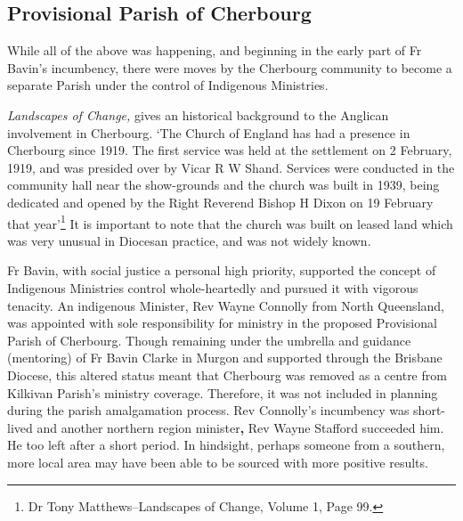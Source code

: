 \subsection{Provisional Parish of Cherbourg}



While all of the above was happening, and beginning in the early part of Fr Bavin's incumbency, there were moves by the Cherbourg community to become a separate Parish under the control of Indigenous Ministries.



\emph{Landscapes of Change,} gives an historical background to the Anglican involvement in Cherbourg. `The Church of England has had a presence in Cherbourg since 1919. The first service was held at the settlement on 2 February, 1919, and was presided over by Vicar R W Shand. Services were conducted in the community hall near the show-grounds and the church was built in 1939, being dedicated and opened by the Right Reverend Bishop H Dixon on 19 February that year'\footnote{Dr Tony Matthews--Landscapes of Change, Volume 1, Page 99.} It is important to note that the church was built on leased land which was very unusual in Diocesan practice, and was not widely known.


Fr Bavin, with social justice a personal high priority, supported the concept of Indigenous Ministries control whole-heartedly and pursued it with vigorous tenacity. An indigenous Minister, Rev Wayne Connolly from North Queensland, was appointed with sole responsibility for ministry in the proposed Provisional Parish of Cherbourg. Though remaining under the umbrella and guidance (mentoring) of Fr Bavin Clarke in Murgon and supported through the Brisbane Diocese, this altered status meant that Cherbourg was removed as a centre from Kilkivan Parish's ministry coverage. Therefore, it was not included in planning during the parish amalgamation process. Rev Connolly's incumbency was short-lived and another northern region minister\textbf{,} Rev Wayne Stafford succeeded him. He too left after a short period. In hindsight, perhaps someone from a southern, more local area may have been able to be sourced with more positive results.



